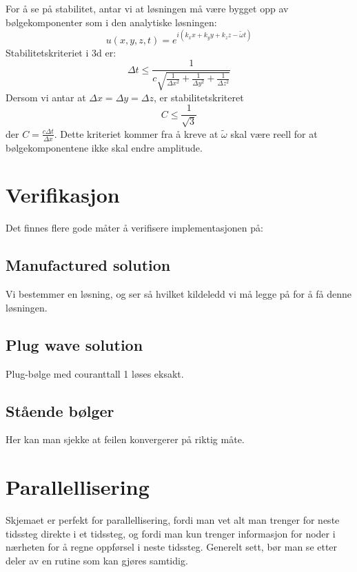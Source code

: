 \documentclass[a4paper, 10pt]{article}
\begin{document}
For å se på stabilitet, antar vi at løsningen må være bygget opp av bølgekomponenter som i den analytiske løsningen:
\begin{equation}
	u(x, y, z, t) = e^{i(k_x x + k_y y + k_z z - \tilde{\omega}t)}
\end{equation}
Stabilitetskriteriet i 3d er:
\begin{equation}
	 \Delta t \leq \frac{1}{c \sqrt{ \frac{1}{\Delta x^2} + \frac{1}{\Delta y^2} + \frac{1}{\Delta z^2}}}
\end{equation}
Dersom vi antar at $\Delta x = \Delta y = \Delta z$, er stabilitetskriteret
\begin{equation}
	C \leq \frac{1}{\sqrt{3}}
\end{equation}
der $C = \frac{c \Delta t}{\Delta x}$. Dette kriteriet kommer fra å kreve at $\tilde{\omega}$ skal være reell for at bølgekomponentene ikke skal endre amplitude. 

\section{Verifikasjon}
Det finnes flere gode måter å verifisere implementasjonen på:

\subsection{Manufactured solution}
Vi bestemmer en løsning, og ser så hvilket kildeledd vi må legge på for å få denne løsningen. 

\subsection{Plug wave solution}
Plug-bølge med couranttall 1 løses eksakt. 

\subsection{Stående bølger}
Her kan man sjekke at feilen konvergerer på riktig måte.


\section{Parallellisering}
Skjemaet er perfekt for parallellisering, fordi man vet alt man trenger for neste tidssteg direkte i et tidssteg, og fordi man kun trenger informasjon for noder i nærheten for å regne oppførsel i neste tidssteg. 
Generelt sett, bør man se etter deler av en rutine som kan gjøres samtidig. 
\end{document}
